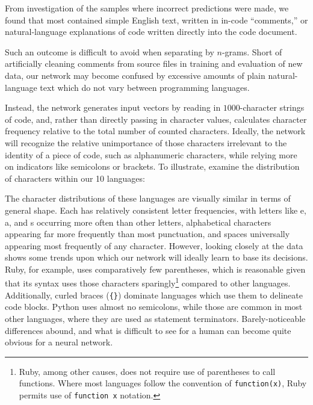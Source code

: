 \documentclass{article}
\begin{document}
From investigation of the samples where incorrect predictions were made, we found that most contained simple English text, written in in-code ``comments,'' or natural-language explanations of code written directly into the code document.

Such an outcome is difficult to avoid when separating by $n$-grams. Short of artificially cleaning comments from source files in training and evaluation of new data, our network may become confused by excessive amounts of plain natural-language text which do not vary between programming languages.

Instead, the network generates input vectors by reading in $1000$-character strings of code, and, rather than directly passing in character values, calculates character frequency relative to the total number of counted characters. Ideally, the network will recognize the relative unimportance of those characters irrelevant to the identity of a piece of code, such as alphanumeric characters, while relying more on indicators like semicolons or brackets. To illustrate, examine the distribution of characters within our 10 languages:

\begin{center}
\end{center}
The character distributions of these languages are visually similar in terms of general shape. Each has relatively consistent letter frequencies, with letters like e, a, and s occurring more often than other letters, alphabetical characters appearing far more frequently than most punctuation, and spaces universally appearing most frequently of any character. However, looking closely at the data shows some trends upon which our network will ideally learn to base its decisions. Ruby, for example, uses comparatively few parentheses, which is reasonable given that its syntax uses those characters sparingly\footnote{Ruby, among other causes, does not require use of parentheses to call functions. Where most languages follow the convention of \texttt{function(x)}, Ruby permits use of \texttt{function x} notation.} compared to other languages. Additionally, curled braces (\texttt{\{\}}) dominate languages which use them to delineate code blocks. Python uses almost no semicolons, while those are common in most other languages, where they are used as statement terminators. Barely-noticeable differences abound, and what is difficult to see for a human can become quite obvious for a neural network.
\end{document}
